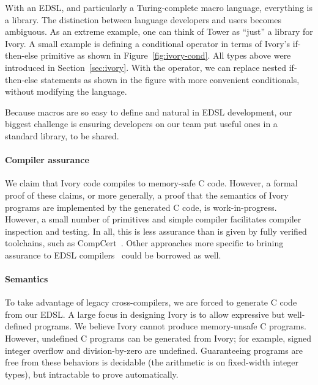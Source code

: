 With an EDSL, and particularly a Turing-complete macro language, everything is a
library.  The distinction between language developers and users becomes
ambiguous.  As an extreme example, one can think of Tower as ``just'' a library
for Ivory.  A small example is defining a conditional operator in terms of
Ivory's if-then-else primitive as shown in Figure~\ref{fig:ivory-cond}.  All
types above were introduced in Section~\ref{sec:ivory}.  With the 
operator, we can replace nested if-then-else statements as shown in the figure
with more convenient conditionals, without modifying the language.

Because macros are so easy to define and natural in EDSL development, our
biggest challenge is ensuring developers on our team put useful ones in a
standard library, to be shared.


\paragraph{Compiler assurance}

We claim that Ivory code compiles to memory-safe C code.  However, a formal
proof of these claims, or more generally, a proof that the semantics of Ivory
programs are implemented by the generated C code, is work-in-progress.  However,
a small number of primitives and simple compiler facilitates compiler inspection
and testing. In all, this is less assurance than is given by fully verified
toolchains, such as CompCert~\cite{compcert}.  Other approaches more specific to
brining assurance to EDSL compilers~\cite{pike-icfp-12} could be borrowed as
well.

\paragraph{Semantics}
To take advantage of legacy cross-compilers, we are forced to
generate C code from our EDSL.  A large focus in designing Ivory is to allow
expressive but well-defined programs.  We believe Ivory
cannot produce memory-unsafe C programs.  However, undefined C programs can be
generated from Ivory; for example, signed integer overflow and division-by-zero
are undefined.  Guaranteeing programs are free from these behaviors is decidable
(the arithmetic is on fixed-width integer types), but intractable to prove
automatically.

